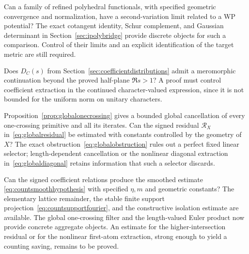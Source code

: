\begin{question}
Can a family of refined polyhedral functionals, with specified geometric
convergence and normalization, have a second-variation limit related to
a WP potential? The exact cotangent identity, Schur complement, and
Gaussian determinant in Section~\ref{sec:ipolybridge} provide discrete
objects for such a comparison. Control of their limits and an explicit
identification of the target metric are still required.
\end{question}

\begin{question}
Does $D_C(s)$ from Section~\ref{sec:coefficientdistributions} admit a
meromorphic continuation beyond the proved half-plane $\Re s>1$?
A proof must control coefficient extraction in the continued
character-valued expression, since it is not bounded for the
uniform norm on unitary characters.
\end{question}

\begin{question}
Proposition~\ref{prop:globalonecrossing} gives a bounded global
cancellation of every one-crossing primitive and all its iterates.
Can the signed residual $\mathcal R_X$ in~\eqref{eq:globalresidual}
be estimated with constants controlled by the geometry of $X$?
The exact obstruction~\eqref{eq:globalobstruction} rules out a
perfect fixed linear selector; length-dependent cancellation or
the nonlinear diagonal extraction in~\eqref{eq:globaldiagonal}
retains information that such a selector discards.
\end{question}

\begin{question}
Can the signed coefficient relations produce the smoothed estimate
\eqref{eq:countsmoothhypothesis} with specified $\eta,m$ and geometric
constants? The elementary lattice remainder, the stable finite support
projection~\eqref{eq:countsupportfourier}, and the constructive isolation
estimate are available. The global one-crossing filter and the
length-valued Euler product now provide concrete aggregate objects.
An estimate for the higher-intersection residual or for the nonlinear
first-atom extraction, strong enough to yield a counting saving,
remains to be proved.
\end{question}

